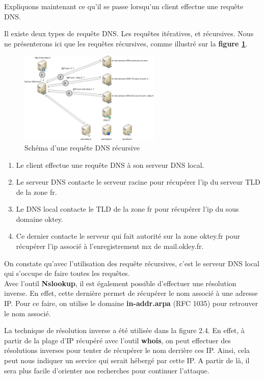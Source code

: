 \newpage

Expliquons maintenant ce qu'il se passe lorsqu'un client effectue une requête DNS.

Il existe deux types de requête DNS. Les requêtes itératives, et récursives. Nous ne présenterons ici que les requêtes récursives, comme illustré sur la \textbf{figure \ref{fig:dns2}}.

\begin{figure}[t]
  \centering
  \includegraphics[width=0.6\textwidth]{oui/images/Nslookup/dns2.png}
  \caption{Schéma d'une requête DNS récursive}
  \label{fig:dns2}
\end{figure}

\begin{enumerate}
    \item Le client effectue une requête DNS à son serveur DNS local.
    \item Le serveur DNS contacte le serveur racine pour récupérer l'ip du serveur TLD de la zone fr.
    \item Le DNS local contacte le TLD de la zone fr pour récupérer l'ip du sous domaine oktey.
    \item Ce dernier contacte le serveur qui fait autorité sur la zone oktey.fr pour récupérer l'ip associé à l'enregistrement mx de mail.okley.fr.
\end{enumerate}

\noindent On constate qu'avec l'utilisation des requête récursives, c'est le serveur DNS local qui s'occupe de faire toutes les requêtes.\\
\noindent Avec l'outil \textbf{Nslookup}, il est également possible d'effectuer une résolution inverse. En effet, cette dernière permet de récupérer le nom associé à une adresse IP. Pour ce faire, on utilise le domaine \textbf{in-addr.arpa} (RFC 1035) pour retrouver le nom associé.

\noindent La technique de résolution inverse a été utilisée dans la figure 2.4. En effet, à partir de la plage d'IP récupéré avec l'outil \textbf{whois}, on peut effectuer des résolutions inverses pour tenter de récupérer le nom derrière ces IP. Ainsi, cela peut nous indiquer un service qui serait hébergé par cette IP. A partir de là, il sera plus facile d'orienter nos recherches pour continuer l'attaque.


